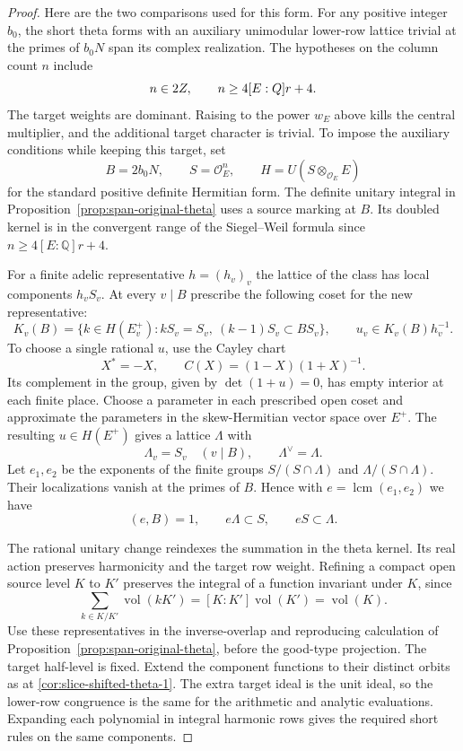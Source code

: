 \begin{proof}
Here are the two comparisons used for this form. For any
positive integer \(b_0\), the short theta forms with an
auxiliary unimodular lower-row lattice trivial at the primes
of \(b_0N\) span its complex realization. The hypotheses on the column count \(n\) include 
\[
 n\in2Z,\qquad n\ge4[E:Q]r+4.
\]
The target weights are dominant. Raising to the power \(w_E\)
above kills the central multiplier, and the additional target
character is trivial. To impose the auxiliary conditions while
keeping this target, set
\[
 B=2b_0N,\qquad S=\mathcal O_E^n,\qquad
 H=U(S\otimes_{\mathcal O_E}E)
\]
for the standard positive definite Hermitian form.
The definite unitary integral in
Proposition~\ref{prop:span-original-theta} uses a source marking
at \(B\). Its doubled kernel is in the convergent range of the
Siegel--Weil formula since \(n\ge4[E:\mathbb Q]r+4\).
\cite[Theorem~2]{yamana-siegel-weil}

For a finite adelic representative \(h=(h_v)_v\) the lattice of
the class has local components \(h_vS_v\). At every \(v\mid B\)
prescribe the following coset for the new representative:
\[
 K_v(B)=\{k\in H(E^+_v):kS_v=S_v,\ (k-1)S_v\subset BS_v\},
 \qquad u_v\in K_v(B)h_v^{-1}.
\]
To choose a single rational \(u\), use the Cayley chart
\[
 X^*=-X,\qquad C(X)=(1-X)(1+X)^{-1}.
\]
Its complement in the group, given by \(\det(1+u)=0\), has empty
interior at each finite place. Choose a parameter in each prescribed
open coset and approximate the parameters in the skew-Hermitian
vector space over \(E^+\). The resulting \(u\in H(E^+)\) gives
a lattice \(\Lambda\) with
\[
 \Lambda_v=S_v\quad(v\mid B),\qquad \Lambda^\vee=\Lambda .
\]
Let \(e_1,e_2\) be the exponents of the finite groups
\(S/(S\cap\Lambda)\) and \(\Lambda/(S\cap\Lambda)\). Their
localizations vanish at the primes of \(B\). Hence with
\(e=\operatorname{lcm}(e_1,e_2)\) we have
\[
 (e,B)=1,\qquad e\Lambda\subset S,\qquad eS\subset\Lambda .
\]

The rational unitary change reindexes the summation in the theta
kernel. Its real action preserves harmonicity and the target row
weight. Refining a compact open source level \(K\) to \(K'\)
preserves the integral of a function invariant under \(K\), since
\[
           \sum_{k\in K/K'}\operatorname{vol}(kK')
                       =[K:K']\operatorname{vol}(K')
                       =\operatorname{vol}(K).
\]
Use these representatives in the inverse-overlap and reproducing
calculation of Proposition~\ref{prop:span-original-theta}, before
the good-type projection. The target half-level is fixed. Extend
the component functions to their distinct orbits as at
\ref{cor:slice-shifted-theta-1}. The extra target ideal is the unit
ideal, so the lower-row congruence is the same for the arithmetic
and analytic evaluations. Expanding each polynomial in integral
harmonic rows gives the required short rules on the same components.


\end{proof}
